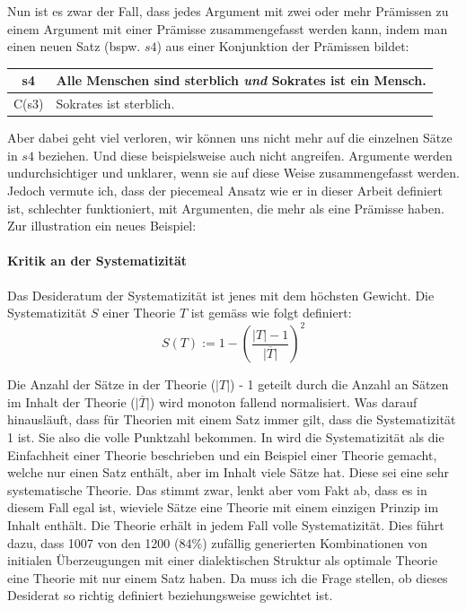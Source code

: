 \documentclass{article}
\begin{document}
Nun ist es zwar der Fall, dass jedes Argument mit zwei oder mehr Prämissen zu einem Argument mit einer Prämisse zusammengefasst werden kann, indem man einen neuen Satz (bspw. $s4$) aus einer Konjunktion der Prämissen bildet:

\begin{center}
\begin{tabular}{c p{9cm}}
s4 & Alle Menschen sind sterblich \textit{und} Sokrates ist ein Mensch.\\\hline
C(s3) & Sokrates ist sterblich. 
\end{tabular}
\end{center}

Aber dabei geht viel verloren, wir können uns nicht mehr auf die einzelnen Sätze in $s4$ beziehen. Und diese beispielsweise auch nicht angreifen. Argumente werden undurchsichtiger und unklarer, wenn sie auf diese Weise zusammengefasst werden.
Jedoch vermute ich, dass der piecemeal Ansatz wie er in dieser Arbeit definiert ist, schlechter funktioniert, mit Argumenten, die mehr als eine Prämisse haben. Zur illustration ein neues Beispiel:

\paragraph{Kritik an der Systematizität}
Das Desideratum der Systematizität ist jenes mit dem höchsten Gewicht. Die Systematizität $S$ einer Theorie $T$ ist gemäss \autocite[S. 465]{beisbart_making_2021} wie folgt definiert:
$$
S(T) := 1- \left(\frac{\lvert T \rvert -1}{\lvert \overline{T} \rvert}\right)^2
$$

Die Anzahl der Sätze in der Theorie ($\lvert T \rvert$) - 1 geteilt durch die Anzahl an Sätzen im Inhalt der Theorie ($\lvert \overline{T} \rvert$) wird monoton fallend normalisiert. Was darauf hinausläuft, dass für Theorien mit einem Satz immer gilt, dass die Systematizität 1 ist. Sie also die volle Punktzahl bekommen. In \autocite[S.~447]{beisbart_making_2021} wird die Systematizität als die Einfachheit einer Theorie beschrieben und ein Beispiel einer Theorie gemacht, welche nur einen Satz enthält, aber im Inhalt viele Sätze hat. Diese sei eine sehr systematische Theorie. Das stimmt zwar, lenkt aber vom Fakt ab, dass es in diesem Fall egal ist, wieviele Sätze eine Theorie mit einem einzigen Prinzip im Inhalt enthält. Die Theorie erhält in jedem Fall volle Systematizität. Dies führt dazu, dass 1007 von den 1200 (84\%) zufällig generierten Kombinationen von initialen Überzeugungen mit einer dialektischen Struktur als optimale Theorie eine Theorie mit nur einem Satz haben. Da muss ich die Frage stellen, ob dieses Desiderat so richtig definiert beziehungsweise gewichtet ist.
\end{document}
